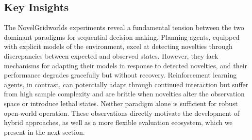 \subsection{Key Insights}
\label{sec:ngw_insights}

The NovelGridworlds experiments reveal a fundamental tension between the two dominant paradigms for sequential decision-making. Planning agents, equipped with explicit models of the environment, excel at detecting novelties through discrepancies between expected and observed states. However, they lack mechanisms for adapting their models in response to detected novelties, and their performance degrades gracefully but without recovery. Reinforcement learning agents, in contrast, can potentially adapt through continued interaction but suffer from high sample complexity and are brittle when novelties alter the observation space or introduce lethal states. Neither paradigm alone is sufficient for robust open-world operation. These observations directly motivate the development of hybrid approaches, as well as a more flexible evaluation ecosystem, which we present in the next section.